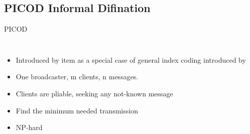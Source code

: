 \documentclass[xcolor=dvipsnames, aspectratio=169]{beamer}
\begin{document}
\subsection{PICOD Informal Difination}
\begin{frame}{PICOD}
	\begin{columns}[c] %
		
		\begin{itemize}
			\item<1-> Introduced by \textcite{pliablefirstpaper} item as a special case of general index coding introduced by \textcite{firstpaper}
			\item<2-> One broadcaster, m clients, n messages.
			\item<3-> Clients are pliable, seeking any not-known message
			\item<4-> Find the minimum needed transmission
			\item<5-> NP-hard
			
		\end{itemize}
		
		
	\end{columns}
	
\end{frame}
\end{document}
